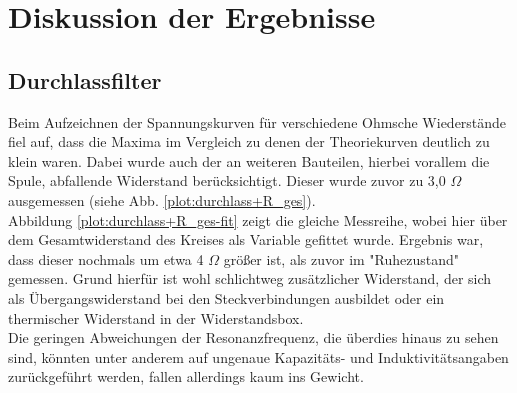 \section{Diskussion der Ergebnisse}

\subsection{Durchlassfilter}
Beim Aufzeichnen der Spannungskurven für verschiedene Ohmsche Wiederstände fiel auf, dass die Maxima im Vergleich zu denen der Theoriekurven deutlich zu klein waren. Dabei wurde auch der an weiteren Bauteilen, hierbei vorallem die Spule, abfallende Widerstand berücksichtigt. Dieser wurde zuvor zu 3,0 $  \Omega $ ausgemessen (siehe Abb. \ref{plot:durchlass+R_ges}).\\
Abbildung \ref{plot:durchlass+R_ges-fit} zeigt die gleiche Messreihe, wobei hier über dem Gesamtwiderstand des Kreises als Variable gefittet wurde. Ergebnis war, dass dieser nochmals um etwa 4 $  \Omega $ größer ist, als zuvor im "Ruhezustand" gemessen. Grund hierfür ist wohl schlichtweg zusätzlicher Widerstand, der sich als Übergangswiderstand bei den Steckverbindungen ausbildet oder ein thermischer Widerstand in der Widerstandsbox.\\
Die geringen Abweichungen der Resonanzfrequenz, die überdies hinaus zu sehen sind, könnten unter anderem auf ungenaue Kapazitäts- und Induktivitätsangaben zurückgeführt werden, fallen allerdings kaum ins Gewicht.
